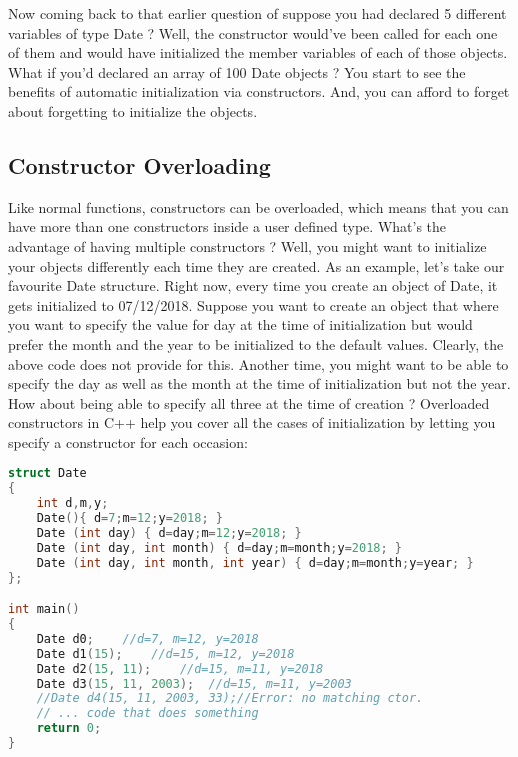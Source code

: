 \documentclass[11pt,fleqn]{book} %
\begin{document}
Now coming back to that earlier question of suppose you had declared 5 different variables of type Date ? Well, the constructor would've been called for each one of them and would have initialized the member variables of each of those objects. What if you'd declared an array of 100 Date objects ? You start to see the benefits of automatic initialization via constructors. And, you can afford to forget about forgetting to initialize the objects.

\subsection{Constructor Overloading}

Like normal functions, constructors can be overloaded, which means that you can have more than one constructors inside a user defined type. What's the advantage of having multiple constructors ? Well, you might want to initialize your objects differently each time they are created. As an example, let's take our favourite Date structure. Right now, every time you create an object of Date, it gets initialized to 07/12/2018. Suppose you want to create an object that where you want to specify the value for day at the time of initialization but would prefer the month and the year to be initialized to the default values. Clearly, the above code does not provide for this. Another time, you might want to be able to specify the day as well as the month at the time of initialization but not the year. How about being able to specify all three at the time of creation ? Overloaded constructors in C++ help you cover all the cases of initialization by letting you specify a constructor for each occasion:
\begin{lstlisting}[language=C++, caption = Overloaded constructors]
struct Date 
{
	int d,m,y;
	Date(){ d=7;m=12;y=2018; } 
	Date (int day) { d=day;m=12;y=2018; } 
	Date (int day, int month) { d=day;m=month;y=2018; } 
	Date (int day, int month, int year) { d=day;m=month;y=year; } 
};

int main()
{
	Date d0;	//d=7, m=12, y=2018
	Date d1(15);	//d=15, m=12, y=2018
	Date d2(15, 11);	//d=15, m=11, y=2018
	Date d3(15, 11, 2003);	//d=15, m=11, y=2003
	//Date d4(15, 11, 2003, 33);//Error: no matching ctor.
	// ... code that does something
	return 0;
}
\end{lstlisting}
\end{document}
